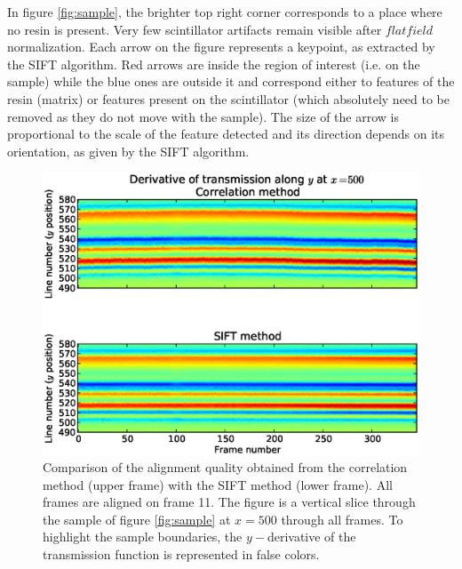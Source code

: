 \documentclass[preprint]{iucr}
\begin{document}
In figure \ref{fig:sample}, the brighter top right corner corresponds
to a place where no resin is present. Very few scintillator artifacts remain visible after $flat
field$ normalization.
Each arrow on the figure represents a keypoint, as extracted by the SIFT
algorithm. Red arrows are inside the region of interest (i.e. on the
sample) while the blue ones are outside it and
correspond either to features of the resin (matrix) or features present on
the scintillator (which absolutely need to be removed as they do not move
with the sample).
The size of the arrow is proportional to the scale of the feature
detected and its direction depends on its orientation, as given by the SIFT algorithm.

\begin{figure}
\label{fig:alignment}
\begin{center}
\includegraphics[width=15cm]{alignment_h.eps}
\caption{Comparison of the alignment quality obtained from the correlation
method (upper frame) with the SIFT method (lower frame). All frames are aligned
on frame 11. The figure is a vertical slice through the sample of figure
\ref{fig:sample} at $x=500$ through all frames. To highlight the sample
boundaries, the $y-$derivative of the transmission function is represented in
false colors.}
\end{center}
\end{figure}
\end{document}
